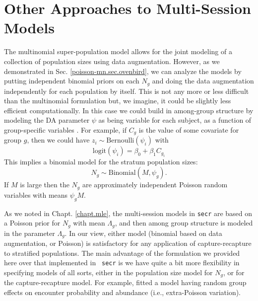 \section{Other Approaches to Multi-Session Models}

The multinomial super-population model allows for the joint modeling
of a collection of population sizes using data augmentation.  However,
as we demonstrated in Sec. \ref{poisson-mn.sec.ovenbird}, we can
analyze the models by putting independent binomial priors on each
$N_{g}$ and doing the data augmentation independently for each
population by itself.  This is not any more or less difficult than the
multinomial formulation but, we imagine, it could be slightly less
efficient computationally.  In this case we could build in
among-group structure by modeling the DA parameter $\psi$ as being
variable for each subject, as a function of group-specific variables
\citep[see][for an example]{hendriks_etal:2013}.  For example, if
$C_{g}$ is the value of some covariate for group $g$, then we could
have $z_{i} \sim \mbox{Bernoulli}( \psi_{i})$ with
\[
 \mbox{logit}(\psi_{i}) = \beta_0 + \beta_1  C_{g_{i}}
\]
This implies a binomial model for the stratum population sizes:
\[
N_{g} \sim \mbox{Binomial}(M, \psi_{g}).
\]
If $M$ is large then the $N_{g}$ are approximately
independent Poisson random variables with means $\psi_{g} M$.

As we noted in Chapt. \ref{chapt.mle}, the multi-session models in
\mbox{\tt secr} are based on a Poisson prior for $N_{g}$ with mean
$\Lambda_{g}$, and then among group structure is modeled in the
parameter $\Lambda_{g}$. In our view, either model (binomial based on
data augmentation, or Poisson) is satisfactory for any application of
capture-recapture to stratified populations.  The main advantage of
the formulation we provided here over that implemented in \mbox{\tt
  secr} is we have quite a bit more flexibility in specifying models
of all sorts, either in the population size model for $N_{g}$, or for
the capture-recapture model. For example, \citet{royle_converse:2013}
fitted a model having random group effects on encounter probability
and abundance (i.e., extra-Poisson variation).


